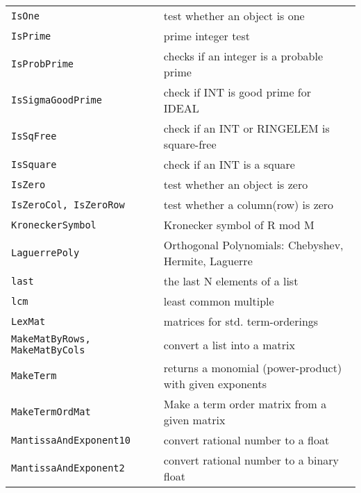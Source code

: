 \documentclass[a4paper]{mybook}
\begin{document}
\begin{center}
\begin{longtable}{ll}
{\verb~IsOne~} &
      test whether an object is one\\
   
{\verb~IsPrime~} &
      prime integer test\\
   
{\verb~IsProbPrime~} &
      checks if an integer is a probable prime\\
   
{\verb~IsSigmaGoodPrime~} &
      check if INT is good prime for IDEAL \\
   
{\verb~IsSqFree~} &
      check if an INT or RINGELEM is square-free\\
   
{\verb~IsSquare~} &
      check if an INT is a square\\
   
{\verb~IsZero~} &
      test whether an object is zero\\
   
{\verb~IsZeroCol, IsZeroRow~} &
      test whether a column(row) is zero\\
   
{\verb~KroneckerSymbol~} &
      Kronecker symbol of R mod M\\
   
{\verb~LaguerrePoly~} &
      Orthogonal Polynomials: Chebyshev, Hermite, Laguerre\\
   
{\verb~last~} &
      the last N elements of a list\\
   
{\verb~lcm~} &
      least common multiple\\
   
{\verb~LexMat~} &
      matrices for std. term-orderings\\
   
{\verb~MakeMatByRows, MakeMatByCols~} &
      convert a list into a matrix\\
   
{\verb~MakeTerm~} &
      returns a monomial (power-product) with given exponents\\
   
{\verb~MakeTermOrdMat~} &
      Make a term order matrix from a given matrix\\
   
{\verb~MantissaAndExponent10~} &
      convert rational number to a float\\
   
{\verb~MantissaAndExponent2~} &
      convert rational number to a binary float\\
   

\end{longtable}
\end{center}
\end{document}
